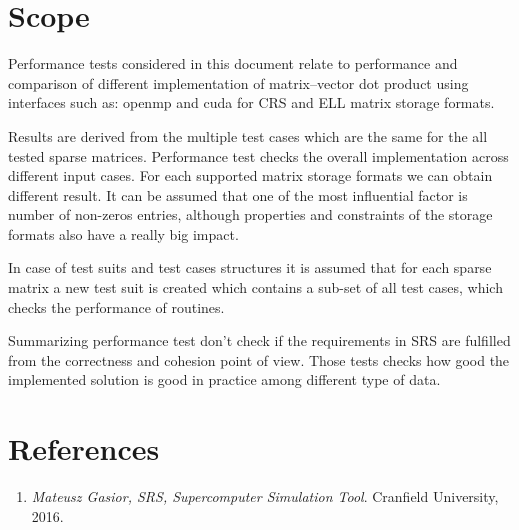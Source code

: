 \section{Scope} \label{s:introduction:scope}
	\begin{comment}
		Identify the test items (software or system) that are the object of testing, e.g., specific attributes of the
		software, the installation instructions, the user instructions, interfacing hardware, database conversion
		software that is not a part of the operational system) including their version/revision level. Also
		identify any procedures for their transfer from other environments to the test environment.
		Supply references to the test item documentation relevant to an individual level of test, if it exists, such
		as follows:
		⎯ Requirements
		⎯ Design
		⎯ User’s guide
		⎯ Operations guide
		⎯ Installation guide
		Reference any Anomaly Reports relating to the test items.
		Identify any items that are to be specifically excluded from testing.
	\end{comment}
	Performance tests considered in this document relate to performance and comparison of different implementation of matrix--vector dot product using interfaces such as: \gls{openmp} and \gls{cuda} for \gls{CRS} and \gls{ELL} matrix storage formats. 
	
	Results are derived from the multiple test cases which are the same for the all tested sparse matrices. Performance test checks the overall implementation across different input cases. For each supported matrix storage formats we can obtain different result. It can be assumed that one of the most influential factor is number of non-zeros entries, although properties and constraints of the storage formats also have a really big impact.
	
	In case of test suits and test cases structures it is assumed that for each sparse matrix a new test suit is created which contains a sub-set of all test cases, which checks the performance of routines.
	
	Summarizing performance test don't check if the requirements in \gls{SRS} are fulfilled from the correctness and cohesion point of view. Those tests checks how good the implemented solution is good in practice among different type of data.
	
\section{References} \label{s:introduction:references}
	\begin{comment}
		List all of the applicable reference documents. The references are separated into “external” references
		that are imposed external to the project and “internal” references that are imposed from within to the
		project. This may also be at the end of the document.
	\end{comment}
	\begin{enumerate}
		\item \emph{Mateusz Gasior, \gls{SRS}, Supercomputer Simulation Tool}. Cranfield University, 2016. 
	\end{enumerate}